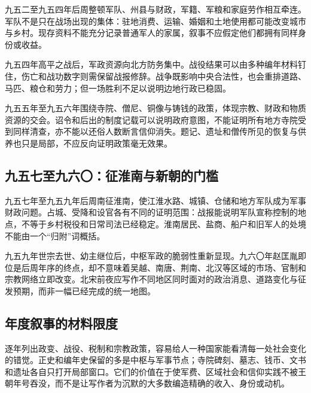 九五二至九五四年后周整顿军队、州县与财政，军籍、军粮和家庭劳作相互牵连。军队不是只在战场出现的集体：驻地消费、运输、婚姻和土地使用都可能改变城市与乡村。现存资料不能充分记录普通军人的家属，叙事不应假定他们都拥有同样身份或收益。

九五四年高平之战后，军政资源向北方防务集中。战役结果可以由多种编年材料钉住，伤亡和战功数字则需保留战报修辞。战争既影响中央合法性，也会重排道路、马匹、粮仓和劳力；但一场胜利不足以说明边地行政已稳固。

九五五年至九五六年围绕寺院、僧尼、铜像与铸钱的政策，体现宗教、财政和物质资源的交会。诏令和后出的制度记载可以说明政府意图，不能证明所有地方寺院受到同样清查，亦不能以还俗人数断言信仰消失。题记、遗址和僧传所见的恢复与供养也只是局部，不应反向证明政策毫无效果。

\subsection{九五七至九六〇：征淮南与新朝的门槛}

九五七年至九五九年后周南征淮南，使江淮水路、城镇、仓储和地方军队成为军事财政问题。占城、受降和设官各有不同的证明范围：战报能说明军队宣称控制的地点，不等于乡村税役和日常司法已经稳定。淮南居民、盐商、船户和旧军人的处境不能由一个“归附”词概括。

九五九年世宗去世、幼主继位后，中枢军政的脆弱性重新显现。九六〇年赵匡胤即位是后周年序的终点，却不意味着吴越、南唐、荆南、北汉等区域的市场、官制和宗教网络立即改变。北宋前夜应写作不同地区同时面对的政治消息、道路变化与征发预期，而非一幅已经完成的统一地图。

\subsection{年度叙事的材料限度}

逐年列出政变、战役、税制和宗教政策，容易给人一种国家能看清每一处社会变化的错觉。正史和编年史保留的多是中枢与军事节点；寺院碑刻、墓志、钱币、文书和遗址各自只打开局部窗口。它们的价值在于使军费、区域社会和信仰实践不被王朝年号吞没，而不是让写作者为沉默的大多数编造精确的收入、身份或动机。
